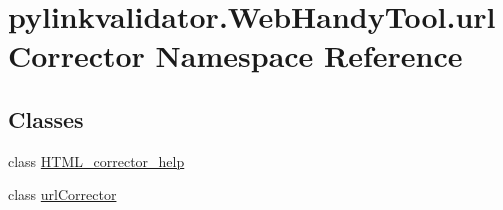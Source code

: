 \hypertarget{namespacepylinkvalidator_1_1_web_handy_tool_1_1url_corrector}{}\section{pylinkvalidator.\+Web\+Handy\+Tool.\+url\+Corrector Namespace Reference}
\label{namespacepylinkvalidator_1_1_web_handy_tool_1_1url_corrector}
\subsection*{Classes}
\begin{DoxyCompactItemize}
\item 
class \hyperlink{classpylinkvalidator_1_1_web_handy_tool_1_1url_corrector_1_1_h_t_m_l__corrector__help}{H\+T\+M\+L\+\_\+corrector\+\_\+help}
\item 
class \hyperlink{classpylinkvalidator_1_1_web_handy_tool_1_1url_corrector_1_1url_corrector}{url\+Corrector}
\end{DoxyCompactItemize}
